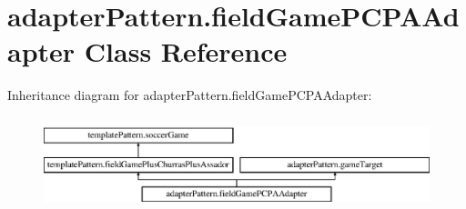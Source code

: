 \hypertarget{classadapter_pattern_1_1field_game_p_c_p_a_adapter}{}\section{adapter\+Pattern.\+field\+Game\+P\+C\+P\+A\+Adapter Class Reference}
\label{classadapter_pattern_1_1field_game_p_c_p_a_adapter}
Inheritance diagram for adapter\+Pattern.\+field\+Game\+P\+C\+P\+A\+Adapter\+:\begin{figure}[H]
\begin{center}
\leavevmode
\includegraphics[height=2.736156cm]{classadapter_pattern_1_1field_game_p_c_p_a_adapter}
\end{center}
\end{figure}
